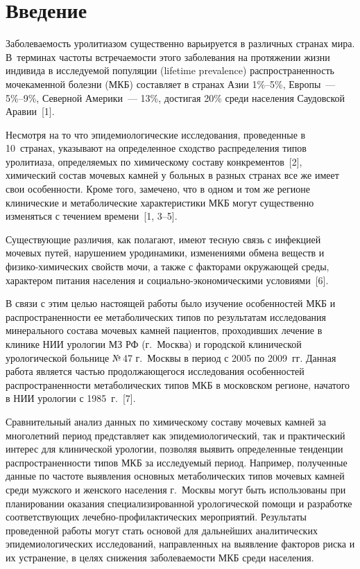 
      \thispagestyle{headings}

      \begin{multicols}{2}

            \label{st\stat}
      
\section{Введение}
      
      Заболеваемость уролитиазом существенно варьи\-руется в различных странах мира. 
В~терминах частоты встречаемости этого заболевания на протяжении жизни индивида в 
исследуемой популяции (lifetime prevalence) распространенность мочекаменной болезни 
(МКБ) составляет в странах Азии 1\%--5\%, Европы~--- 5\%--9\%, Северной Америки~--- 
13\%, достигая 20\% среди населения Саудовской Аравии~[1]. 
      
      Несмотря на то что эпидемиологические исследования, проведенные в 10~странах, 
указывают на определенное сходство распределения типов уролитиаза, определяемых по 
химическому составу конкрементов~[2], химический состав мочевых камней у больных в 
разных странах все же имеет свои особенности. Кроме того, замечено, что в одном и том же 
регионе клинические и метаболические характеристики МКБ могут существенно изменяться 
с течением времени~[1, 3--5].
      
      Существующие различия, как полагают, имеют тесную связь с инфекцией мочевых 
путей, нарушением уродинамики, изменениями обмена веществ и фи\-зи\-ко-хи\-ми\-че\-ских 
свойств мочи, а также с факторами окружающей среды, характером питания населения и 
      со\-ци\-аль\-но-эко\-но\-ми\-че\-ски\-ми условиями~[6].
      
      В связи с этим целью настоящей работы было изучение особенностей МКБ и 
распространен\-ности ее метаболических типов по результатам исследования минерального 
состава мочевых камней пациентов, проходивших лечение в клинике НИИ урологии МЗ РФ 
(г.~Моск\-ва) и городской клинической урологической больнице №\,47 г.~Моск\-вы в период 
с 2005 по 2009~гг. Данная работа является частью продолжающегося исследования 
особенностей распространенности метаболических типов МКБ в московском регионе, 
начатого в НИИ урологии с 1985~г.~[7]. 
      
      Сравнительный анализ данных по химическому составу мочевых камней за 
многолетний период представляет как эпидемиологический, так и практический интерес для 
клинической урологии, позволяя выявить определенные тенденции распространенности 
типов МКБ за исследуемый период. Например, полученные данные по частоте выявления 
основных метаболических типов мочевых камней среди мужского и женского населения\linebreak 
г.~Моск\-вы могут быть использованы при планировании оказания специализированной 
урологической помощи и разработке соответствующих ле\-чеб\-но-про\-фи\-лак\-ти\-че\-ских 
мероприятий. Результаты проведен\-ной работы могут стать основой для дальнейших 
аналитических эпидемиологических исследований, направленных на выявление факторов 
риска и их устранение, в целях снижения заболеваемости МКБ среди населения.
      

\end{multicols}
